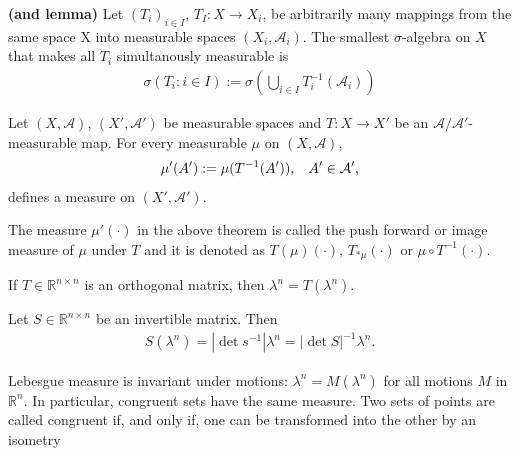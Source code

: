     \begin{definition}
        \textbf{(and lemma)}
        Let $(T_i)_{i\in I}$, $T_I:X\rightarrow X_i$, be arbitrarily many mappings from the same space X into measurable spaces $(X_i,\mathcal A_i).$ The smallest $\sigma$-algebra on $X$ that makes all $T_i$ simultanously measurable is 
        \begin{align}
            \sigma(T_i:i\in I) := \sigma \left( \bigcup_{i\in I}T_i^{-1}(\mathcal A_i)\right)
        \end{align}

    \end{definition}
	
    \begin{theorem}
        Let $(X,\mathcal A)$, $(X',\mathcal A')$ be measurable spaces and $T:X\rightarrow X'$ be an $\mathcal A/\mathcal A'$-measurable map. For every measurable $\mu$ on $(X,\mathcal A)$, 
        \begin{align}
            \mu'(A') := \mu (T^{-1}(A')),\hspace{3mm} A'\in \mathcal A',
        \end{align}
        defines a measure on $(X',\mathcal A')$.
    \end{theorem}

    \begin{definition}
        The measure $\mu'(\cdot)$ in the above theorem is called the push forward or image measure of $\mu$ under $T$ and it is denoted as 
        $T(\mu)(\cdot)$, $T_{*\mu}(\cdot)$ or $\mu\circ T^{-1}(\cdot)$.
    \end{definition}

    \begin{theorem}
        If $T\in \mathbb R^{n\times n} $ is an orthogonal matrix, then $\lambda^n = T(\lambda^n).$
    \end{theorem}

    \begin{theorem}
        Let $S\in\mathbb R^{n\times n}$ be an invertible matrix. Then 
        \begin{align}
        S(\lambda^n) = |\det s^{-1}|\lambda^n = |\det S|^{-1}\lambda^n.    
        \end{align}
    \end{theorem}

    \begin{corollary}
        Lebesgue measure is invariant under motions: $\lambda^n=M(\lambda^n)$ for all motions $M$ in $\mathbb R^n$. In particular, congruent sets have the same measure. Two sets of points are called congruent if, and only if, one can be transformed into the other by an isometry
    \end{corollary}
